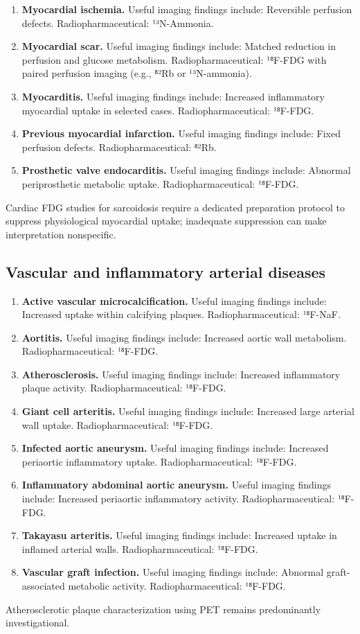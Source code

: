 \begin{enumerate}[leftmargin=*,itemsep=0.45em,topsep=0.4em]
\item \textbf{Myocardial ischemia.} Useful imaging findings include: Reversible perfusion defects. Radiopharmaceutical: ¹³N-Ammonia.
\item \textbf{Myocardial scar.} Useful imaging findings include: Matched reduction in perfusion and glucose metabolism. Radiopharmaceutical: ¹⁸F-FDG with paired perfusion imaging (e.g., ⁸²Rb or ¹³N-ammonia).
\item \textbf{Myocarditis.} Useful imaging findings include: Increased inflammatory myocardial uptake in selected cases. Radiopharmaceutical: ¹⁸F-FDG.
\item \textbf{Previous myocardial infarction.} Useful imaging findings include: Fixed perfusion defects. Radiopharmaceutical: ⁸²Rb.
\item \textbf{Prosthetic valve endocarditis.} Useful imaging findings include: Abnormal periprosthetic metabolic uptake. Radiopharmaceutical: ¹⁸F-FDG.
\end{enumerate}
Cardiac FDG studies for sarcoidosis require a dedicated preparation protocol to suppress physiological myocardial uptake; inadequate suppression can make interpretation nonspecific.

\subsection{Vascular and inflammatory arterial diseases}
\begin{enumerate}[leftmargin=*,itemsep=0.45em,topsep=0.4em]
\item \textbf{Active vascular microcalcification.} Useful imaging findings include: Increased uptake within calcifying plaques. Radiopharmaceutical: ¹⁸F-NaF.
\item \textbf{Aortitis.} Useful imaging findings include: Increased aortic wall metabolism. Radiopharmaceutical: ¹⁸F-FDG.
\item \textbf{Atherosclerosis.} Useful imaging findings include: Increased inflammatory plaque activity. Radiopharmaceutical: ¹⁸F-FDG.
\item \textbf{Giant cell arteritis.} Useful imaging findings include: Increased large arterial wall uptake. Radiopharmaceutical: ¹⁸F-FDG.
\item \textbf{Infected aortic aneurysm.} Useful imaging findings include: Increased periaortic inflammatory uptake. Radiopharmaceutical: ¹⁸F-FDG.
\item \textbf{Inflammatory abdominal aortic aneurysm.} Useful imaging findings include: Increased periaortic inflammatory activity. Radiopharmaceutical: ¹⁸F-FDG.
\item \textbf{Takayasu arteritis.} Useful imaging findings include: Increased uptake in inflamed arterial walls. Radiopharmaceutical: ¹⁸F-FDG.
\item \textbf{Vascular graft infection.} Useful imaging findings include: Abnormal graft-associated metabolic activity. Radiopharmaceutical: ¹⁸F-FDG.
\end{enumerate}
Atherosclerotic plaque characterization using PET remains predominantly investigational.

